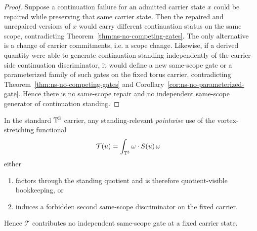 \begin{proof}
Suppose a continuation failure for an admitted carrier state $x$ could be repaired while preserving
that same carrier state. Then the repaired and unrepaired versions of $x$ would carry different
continuation status on the same scope, contradicting Theorem~\ref{thm:ns-no-competing-gates}. The
only alternative is a change of carrier commitments, i.e. a scope change. Likewise, if a derived
quantity were able to generate continuation standing independently of the carrier-side continuation
discriminator, it would define a new same-scope gate or a parameterized family of such gates on the
fixed torus carrier, contradicting Theorem~\ref{thm:ns-no-competing-gates} and
Corollary~\ref{cor:ns-no-parameterized-gate}. Hence there is no same-scope repair and no independent
same-scope generator of continuation standing.
\end{proof}

\begin{lemma}\label{prop:stretching-internal}
In the standard $\mathbb{T}^3$ carrier, any standing-relevant \emph{pointwise} use of the vortex-stretching functional
\[
\mathcal T(u)=\int_{\mathbb{T}^3}\omega\cdot S(u)\,\omega
\]
either
\begin{enumerate}[label=(\roman*), leftmargin=2.2em]
\item factors through the standing quotient and is therefore quotient-visible bookkeeping, or
\item induces a forbidden second same-scope discriminator on the fixed carrier.
\end{enumerate}
Hence $\mathcal T$ contributes no independent same-scope gate at a fixed carrier state.
\end{lemma}

